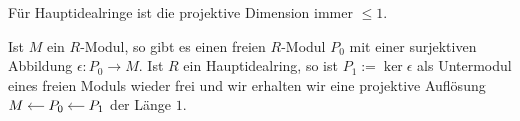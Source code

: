 \begin{satz}[{name=[projektive Dimension von Hauptidealringen]},label=satz:HIR_proj_dim]
	Für Hauptidealringe ist die projektive Dimension immer $\le 1$.
\end{satz}
\begin{beweis}
	Ist $M$ ein $R$-Modul, so gibt es einen freien $R$-Modul $P_0$ mit einer surjektiven Abbildung $\epsilon \colon P_0 \to M$.
	Ist $R$ ein Hauptidealring, so ist $P_1 := \ker \epsilon$ als Untermodul eines freien Moduls wieder frei und wir erhalten wir eine projektive Auflösung
	\(
		\begin{tikzcd}[cramped,sep=small]
			M & P_0 \lar & P_1 \lar
		\end{tikzcd}
	\)
	der Länge $1$.
\end{beweis}

